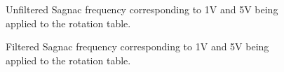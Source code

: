 \documentclass[a4paper]{report}
\numberwithin{equation}{section}
\begin{document}
\begin{figure}[h!]
	\centering
	\quad
	\centering
	\caption{Unfiltered Sagnac frequency corresponding to 1V and 5V being applied to the rotation table.}
\end{figure}

\begin{figure}[h!]
	\centering
	\quad
	\centering
	\caption{Filtered Sagnac frequency corresponding to 1V and 5V being applied to the rotation table.}
\end{figure}




\printbibliography
\end{document}
